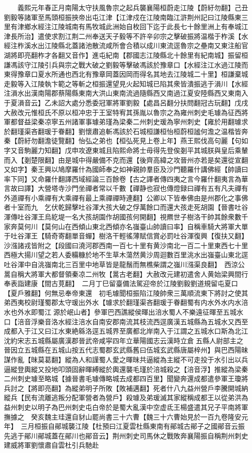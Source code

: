 　　義熙元年春正月南陽太守扶風魯宗之起兵襲襄陽桓蔚走江陵【蔚紆勿翻】己丑劉毅等諸軍至馬頭桓振挾帝出屯江津【江津戍在江陵南臨江滸荆州記曰江陵縣東三里有津鄉水經注江陵城南有馬牧城此洲始自枚回下迄于此長七十餘里洲上有奉城江津長所治】遣使求割江荆二州奉送天子毅等不許辛卯宗之擊破振將温楷于柞溪【水經注柞溪水出江陵縣北蓋諸池散流咸所會合積以成川東流逕魯宗之壘南又東注船官湖將即亮翻柞才各翻又音作】進屯紀南【郡國志江陵縣北十餘里有紀南城】振留桓謙馮該守江陵引兵與宗之戰大破之劉毅等擊破馮該於豫章口【水經注江水過江陵而東得豫章口夏水所通也西北有豫章岡蓋因岡而得名其地去江陵城二十里】桓謙棄城走毅等入江陵執卞範之等斬之桓振還望見火起知城已陷其衆皆潰振逃于溳川【水經注溳水出漢南陽郡蔡陽縣東南大洪山東南流過隨縣西又南過江夏安陸縣西又東南入于夏溳音云】乙未詔大處分悉委冠軍將軍劉毅【處昌呂翻分扶問翻冠古玩翻】戊戌大赦改元惟桓氏不原以桓冲忠于王室特宥其孫胤以魯宗之為雍州刺史毛璩為征西將軍都督益梁秦凉寧五州諸軍事璩弟瑾為梁秦二州刺史瑗為寧州刺史【雍於用翻璩求於翻瑾渠吝翻瑗于眷翻】劉懷肅追斬馮該於石城桓謙桓怡桓蔚桓謐何澹之温楷皆奔秦【蔚紆勿翻澹徒覽翻】怡弘之弟也【桓弘死見上卷上年】燕王熙伐高句麗【句如字又音駒麗力知翻】戊申攻遼東城且陷熙命將士毋得先登俟剗平其城朕與皇后乘輦而入【剗楚限翻】由是城中得嚴備不克而還【後齊高緯之攻晉州亦若是矣還從宣翻又如字】秦王興以鳩摩羅什為國師奉之如神親帥羣臣及沙門聽羅什講佛經【帥讀曰率下同】又命羅什翻譯西域經論三百餘卷【古之譯者傳四夷之言今羅什翻夷言為華言故曰譯】大營塔寺沙門坐禪者常以千數【禪静也寂也傳燈録曰禪有五有凡夫禪有外道禪有小乘禪有大乘禪有最上乘禪禪時連翻】公卿以下皆奉佛由是州郡化之事佛者十室而九　乞伏乾歸擊吐谷渾大孩大破之俘萬餘口而還大孩走死胡園【晉書吐谷渾傳吐谷渾王烏紇堤一名大孩胡園作胡國孩何開翻】視羆世子樹洛干帥其餘衆數千家奔莫何川【莫何山在西傾山東北西傾亦名嵹臺山帥讀曰率】自稱車騎大將軍大單于吐谷渾王【騎奇寄翻單音蟬】樹洛干輕徭薄賦信賞必罰吐谷渾復興【復扶又翻】沙漒諸戎皆附之【段國曰澆河郡西南一百七十里有黄沙南北一百二十里東西七十里西極大揚川望之若人委糒糠於地不生草木蕩然黄沙周迴數百里洮水出嵹臺山東北逕吐谷渾中自洮嵹南北三百里中地草皆是龍鬚而無樵柴謂之嵹川漒渠良翻】　西涼公暠自稱大將軍大都督領秦凉二州牧【暠古老翻】大赦改元建初遣舍人黄始梁興間行奉表詣建康【間古莧翻】　二月丁巳留臺備法駕迎帝於江陵劉毅劉道規留屯夏口【夏戶雅翻】何無忌奉帝東還　初毛璩聞桓振陷江陵帥衆三萬順流東下將討之使其弟西夷校尉瑾蜀郡太守瑗出外水【璩求於翻瑾渠吝翻瑗于眷翻蜀有内水外水内水涪水也外水即蜀江源於岷山者】參軍巴西譙縱侯暉出涪水蜀人不樂遠征暉至五城水口【涪音浮樂音洛水經注涪水自南安郡南流其枝流西逕廣漢五城縣為五城水又西至成都入于江又曰江水東絶緜洛逕五城界至廣都北岸南入于江謂之五城水口斯為北江沈約宋志五城縣屬廣漢郡晉武帝咸寜四年立華陽國志云漢時立倉五縣人尉部主之晉因立五城縣在五城山按五代志蜀郡玄武縣舊曰伍城玄武縣唐屬梓州】與巴西陽昧謀作亂【昩莫葛翻】縱為人和謹蜀人愛之暉昩共逼縱為主縱不可走投于水引出以兵逼縱登輿縱又投地叩頭固辭暉縛縱於輿還襲毛瑾於涪城殺之【涪音浮】推縱為梁秦二州刺史璩至略城【據晉書毛璩傳略城去成都四百里】聞變奔還成都遣參軍王瓊將兵討之【將即亮翻】為縱弟明子所敗【敗補邁翻】死者什八九益州營戶李騰開城納縱兵【民有流離逃叛分配軍營者為營戶】殺璩及弟瑗滅其家縱稱成都王以從弟洪為益州刺史以明子為巴州刺史屯白帝於是蜀大亂漢中空虚氐王楊盛遣其兄子平南將軍撫據之　癸亥魏主珪還自豺山罷尚書三十六曹【魏三十六曹始見於一百九卷隆安元年】　三月桓振自鄖城襲江陵【杜預曰江夏雲杜縣東南有鄖城古鄖子之國鄖音云振先逃于鄖川鄖城蓋在鄖川也鄖音云】荆州刺史司馬休之戰敗奔襄陽振自稱荆州刺史建威將軍劉懷肅自雲杜引兵馳赴